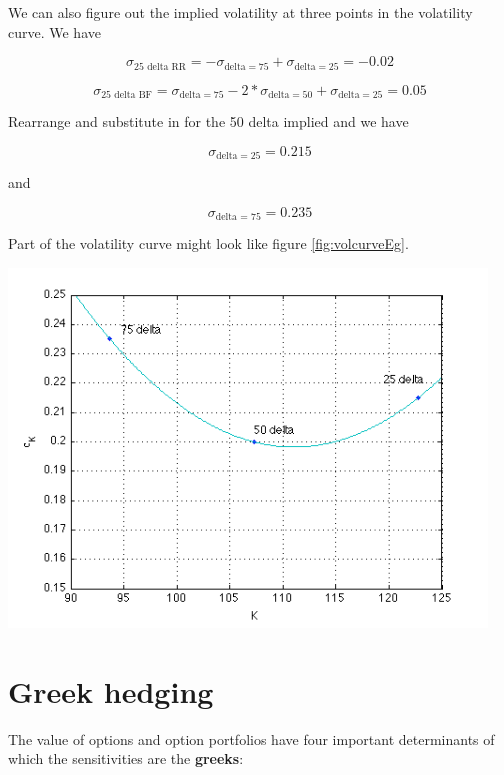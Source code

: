 We can also figure out the implied volatility at three points in the volatility curve. We have 

\[\sigma_{\mbox{25 delta RR}} = -\sigma_{\mbox{delta}=75} +\sigma_{\mbox{delta}=25} = -0.02 \]

\[\sigma_{\mbox{25 delta BF}} = \sigma_{\mbox{delta}=75} -2*\sigma_{\mbox{delta}=50}+ \sigma_{\mbox{delta}=25} = 0.05 \]

Rearrange and substitute in for the 50 delta implied and we have 

\[\sigma_{\mbox{delta}=25} = 0.215\]

 and 
 
 \[ \sigma_{\mbox{delta = 75}} = 0.235 \]
 
Part of the volatility curve might look like figure \ref{fig:volcurveEg}.

  \begin{center}
\includegraphics[width=5in]{pics/volcurveEg}%
\label{fig:volcurveEg}%
\end{center}





\section{Greek hedging}

The value of options and option portfolios have four important determinants of which the sensitivities are the \textbf{greeks}:


